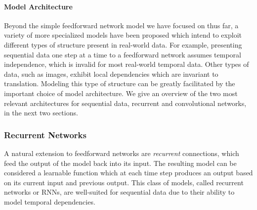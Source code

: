 \paragraph{Model Architecture}

Beyond the simple feedforward network model we have focused on thus far, a variety of more specialized models have been proposed which intend to exploit different types of structure present in real-world data.
For example, presenting sequential data one step at a time to a feedforward network assumes temporal independence, which is invalid for most real-world temporal data.
Other types of data, such as images, exhibit local dependencies which are invariant to translation.
Modeling this type of structure can be greatly facilitated by the important choice of model architecture.
We give an overview of the two most relevant architectures for sequential data, recurrent and convolutional networks, in the next two sections.

\subsubsection{Recurrent Networks}
\label{sec:recurrent_networks}

A natural extension to feedforward networks are {\em recurrent} connections, which feed the output of the model back into its input.
The resulting model can be considered a learnable function which at each time step produces an output based on its current input and previous output.
This class of models, called recurrent networks or RNNs, are well-suited for sequential data due to their ability to model temporal dependencies.

